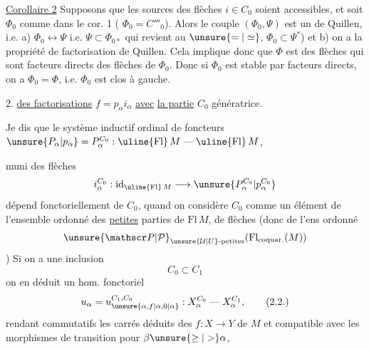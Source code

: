 \uline{Corollaire 2} Supposons que les sources des flèches $i\in C_0$ soient accessibles, et soit $\Phi_0$ comme dans le cor. 1 ( $\Phi_0=C'''_0$). Alors le couple $(\Phi_0,\Psi)$  est un  de Quillen, i.e. a) $\Phi_0\longleftrightarrow\Psi$ i.e. $\Psi\subset\Phi_{0*}$  qui revient au $\unsure{=|\simeq}$, $\Phi_0\subset\Psi^*$) et b) on a la propriété de factorisation de Quillen. Cela implique donc que $\Phi$  est  des  flèches qui sont facteurs directs des flèches de $\Phi_0$. Donc si $\Phi_0$ est stable par facteurs directs, on a $\Phi_0=\Phi$, i.e. $\Phi_0$ est clos à gauche.

2. \uline{ des  factorisations} $f=p_\alpha i_\alpha$ \uline{avec} \uline{la partie} $C_0$ génératrice.

Je dis que le système inductif ordinal de foncteurs $\unsure{P_\alpha|p_\alpha}=P_\alpha^{C_0}:\uline{\mathrm{Fl}}\,M\mathrel{\text{---}}\uline{\mathrm{Fl}}\,M$,

muni des flèches
\[
i_\alpha^{C_0}:\mathrm{id}_{\uline{\mathrm{Fl}}\,M}\longrightarrow\unsure{P_\alpha^{C_0}|p_\alpha^{C_0}}
\]
dépend fonctoriellement de $C_0$, quand on considère $C_0$ comme un élément de l'ensemble ordonné des \uline{petites} parties de $\mathrm{Fl}\,M$,  de flèches  (donc de l'ens ordonné
\[
\unsure{\mathscr P|\mathcal P}_{\unsure{\mathcal U|U}\text{-petites}}(\mathrm{Fl}_{\mathrm{coquar.}}(M))
\]
)\unsure{;|,} Si on a une inclusion
\[
C_0\subset C_1\tag*{(2.1.)}
\]
on en déduit   un hom. fonctoriel
\[
u_\alpha=u_{\unsure{\alpha,f|\alpha,0|\alpha}}^{C_1,C_0}:X_\alpha^{C_0}\mathrel{\text{---}}X_\alpha^{C_1},\tag*{(2.2.)}
\]
rendant commutatifs les carrés déduits des $f:X\to Y$ de $M$
et compatible avec les morphismes de transition pour $\beta\unsure{\geq|>}\alpha$, 

